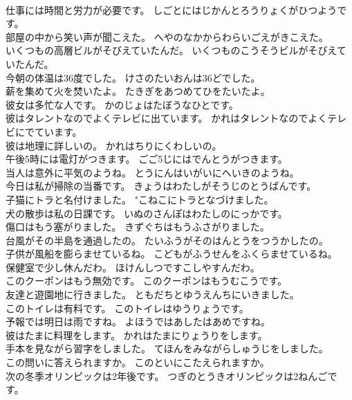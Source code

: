 \documentclass[8pt]{extreport}
\begin{document}
\begin{CJK}{UTF8}{min}
\\	仕事には時間と労力が必要です。	しごとにはじかんとろうりょくがひつようです。 
\\	部屋の中から笑い声が聞こえた。	へやのなかからわらいごえがきこえた。 
\\	いくつもの高層ビルがそびえていたんだ。	いくつものこうそうビルがそびえていたんだ。 
\\	今朝の体温は36度でした。	けさのたいおんは36どでした。 
\\	薪を集めて火を焚いたよ。	たきぎをあつめてひをたいたよ。 
\\	彼女は多忙な人です。	かのじょはたぼうなひとです。 
\\	彼はタレントなのでよくテレビに出ています。	かれはタレントなのでよくテレビにでています。 
\\	彼は地理に詳しいの。	かれはちりにくわしいの。 
\\	午後5時には電灯がつきます。	ごご5じにはでんとうがつきます。 
\\	当人は意外に平気のようね。	とうにんはいがいにへいきのようね。 
\\	今日は私が掃除の当番です。	きょうはわたしがそうじのとうばんです。 
\\	子猫にトラと名付けました。	"こねこにトラとなづけました。 
\\	犬の散歩は私の日課です。	いぬのさんぽはわたしのにっかです。 
\\	傷口はもう塞がりました。	きずぐちはもうふさがりました。 
\\	台風がその半島を通過したの。	たいふうがそのはんとうをつうかしたの。 
\\	子供が風船を膨らませているね。	こどもがふうせんをふくらませているね。 
\\	保健室で少し休んだわ。	ほけんしつですこしやすんだわ。 
\\	このクーポンはもう無効です。	このクーポンはもうむこうです。 
\\	友達と遊園地に行きました。	ともだちとゆうえんちにいきました。 
\\	このトイレは有料です。	このトイレはゆうりょうです。 
\\	予報では明日は雨ですね。	よほうではあしたはあめですね。 
\\	彼はたまに料理をします。	かれはたまにりょうりをします。 
\\	手本を見ながら習字をしました。	てほんをみながらしゅうじをしました。 
\\	この問いに答えられますか。	このといにこたえられますか。 
\\	次の冬季オリンピックは2年後です。	つぎのとうきオリンピックは2ねんごです。 

\end{CJK}
\end{document}
